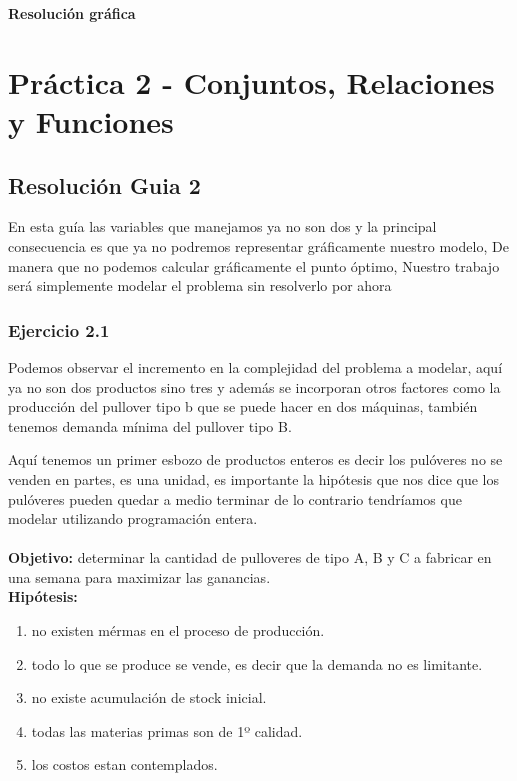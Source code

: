 \documentclass[12pt]{book}
\begin{document}
\begin{center}
\textbf{Resoluci\'on gr\'afica}
\end{center}



\chapter{Práctica 2 - Conjuntos, Relaciones y Funciones}


\section{Resoluci\'on Guia 2}
En esta guía las variables que manejamos ya no son dos y la principal consecuencia es que ya no podremos representar gráficamente nuestro modelo,  De manera que no podemos calcular gráficamente el punto óptimo, Nuestro trabajo será simplemente modelar el problema sin resolverlo por ahora 

\subsection{Ejercicio 2.1}
Podemos observar el incremento en la complejidad del problema a modelar, aquí ya no son dos productos sino tres y además se incorporan otros factores como la producción del pullover tipo b que se puede hacer en dos máquinas, también tenemos demanda mínima del pullover tipo B.

Aquí tenemos un primer esbozo de productos enteros es decir los pulóveres no se venden en partes, es una unidad, es importante la hipótesis que nos dice que los pulóveres pueden quedar a medio terminar de lo contrario tendríamos que modelar utilizando programación entera.
\\ \\
\textbf{Objetivo: }determinar la cantidad de pulloveres de tipo A, B y C a fabricar en una semana para maximizar las ganancias.
\\
\textbf{Hip\'otesis: }
\begin{enumerate}
\item no existen m\'ermas en el proceso de producci\'on.
\item todo lo que se produce se vende, es decir que la demanda no es limitante.
\item no existe acumulaci\'on de stock inicial.
\item todas las materias primas son de 1º calidad.
\item los costos estan contemplados.
\end{enumerate}
\end{document}
